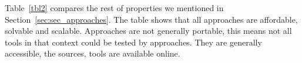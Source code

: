 \documentclass[authoryear,preprint]{sigplanconf}
\begin{document}
Table~\ref{tbl2} compares the rest of properties we mentioned in Section~\ref{sec:sec_approaches}. The table shows that all approaches are affordable, solvable and scalable. Approaches are not generally portable, this means not all tools in that context could be tested by approaches. They are generally accessible, the sources, tools are available online.  
 
	
	
	
	
\end{document}
